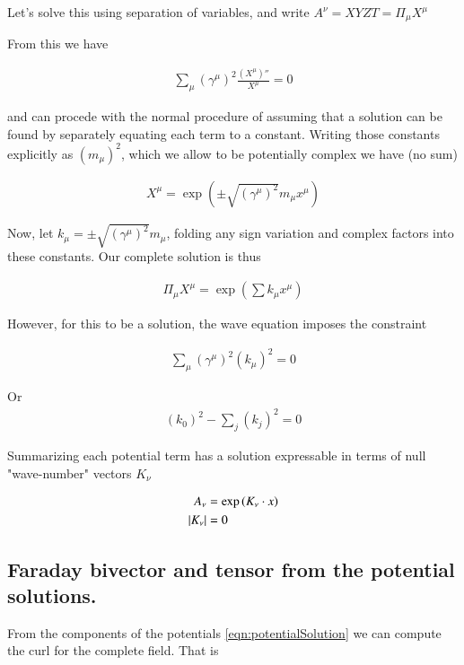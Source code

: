 \documentclass{article}
\begin{document}
Let's solve this using separation of variables, and write $A^\nu = X Y Z T = \Pi_{\mu} X^{\mu}$

From this we have

\begin{align*}
\sum_\mu (\gamma^\mu)^2 \frac{(X^\mu)''}{X^\mu} = 0
\end{align*}

and can procede with the normal procedure of assuming that a solution can be
found by separately equating each term to a constant.  Writing those
constants explicitly as $(m_\mu)^2$, which we allow to be potentially complex
we have (no sum) 

\begin{align*}
X^\mu = \exp\left( \pm \sqrt{(\gamma^\mu)^2} m_\mu x^\mu \right)
\end{align*}

Now, let $k_\mu = \pm \sqrt{(\gamma^\mu)^2} m_\mu$, folding any sign variation
and complex factors into these constants.  Our complete solution
is thus

\begin{align*}
\Pi_\mu X^\mu = \exp\left( \sum k_\mu x^\mu \right)
\end{align*}

However, for this to be a solution, the wave equation imposes the constraint

\begin{align*}
\sum_\mu (\gamma^\mu)^2 (k_\mu)^2 = 0
\end{align*}

Or
\begin{align*}
(k_0)^2 - \sum_j (k_j)^2 = 0
\end{align*}

Summarizing each potential term has a solution expressable in terms of 
null "wave-number" vectors $K_\nu$

\begin{align}\label{eqn:potentialSolution}
A_\nu &= \exp\left( K_\nu \cdot x \right)  \\
\left\lvert{K_\nu}\right\rvert &= 0
\end{align}

\subsection{ Faraday bivector and tensor from the potential solutions. }

From the components of the potentials 
\ref{eqn:potentialSolution}
we can compute the curl for the complete
field.  That is
\end{document}
